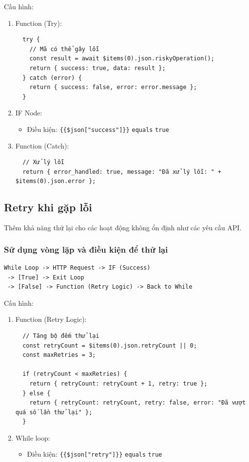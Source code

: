 Cấu hình:
\begin{enumerate}
  \item Function (Try):
  \begin{verbatim}
  try {
    // Mã có thể gây lỗi
    const result = await $items(0).json.riskyOperation();
    return { success: true, data: result };
  } catch (error) {
    return { success: false, error: error.message };
  }
  \end{verbatim}

  \item IF Node:
  \begin{itemize}
    \item Điều kiện: \texttt{\{\{\$json["success"]\}\}} \texttt{equals} \texttt{true}
  \end{itemize}

  \item Function (Catch):
  \begin{verbatim}
  // Xử lý lỗi
  return { error_handled: true, message: "Đã xử lý lỗi: " + $items(0).json.error };
  \end{verbatim}
\end{enumerate}

\newpage
\subsection{Retry khi gặp lỗi}

Thêm khả năng thử lại cho các hoạt động không ổn định như các yêu cầu API.

\subsubsection{Sử dụng vòng lặp và điều kiện để thử lại}

\begin{verbatim}
While Loop -> HTTP Request -> IF (Success) 
 -> [True] -> Exit Loop
 -> [False] -> Function (Retry Logic) -> Back to While
\end{verbatim}

Cấu hình:
\begin{enumerate}
  \item Function (Retry Logic):
  \begin{verbatim}
  // Tăng bộ đếm thử lại
  const retryCount = $items(0).json.retryCount || 0;
  const maxRetries = 3;
  
  if (retryCount < maxRetries) {
    return { retryCount: retryCount + 1, retry: true };
  } else {
    return { retryCount: retryCount, retry: false, error: "Đã vượt quá số lần thử lại" };
  }
  \end{verbatim}

  \item While loop:
  \begin{itemize}
    \item Điều kiện: \texttt{\{\{\$json["retry"]\}\}} \texttt{equals} \texttt{true}
  \end{itemize}
\end{enumerate}

